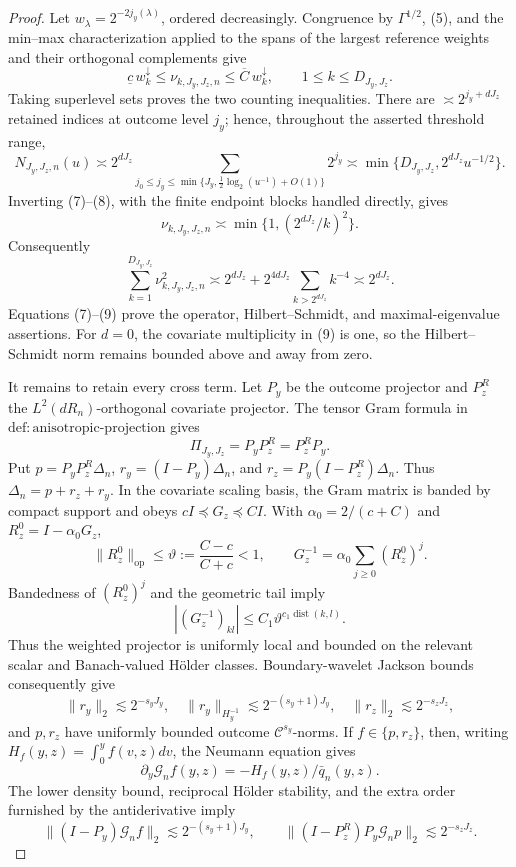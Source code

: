 \documentclass{article}
\begin{document}
\begin{proof}
Let \(w_\lambda=2^{-2j_y(\lambda)}\), ordered decreasingly.  Congruence by \(\Gamma^{1/2}\), (5), and the min--max characterization applied to the spans of the largest reference weights and their orthogonal complements give
\[
\underline c\,w_k^\downarrow\le\nu_{k,J_y,J_z,n}
\le\overline C\,w_k^\downarrow,
\qquad1\le k\le D_{J_y,J_z}. \tag{7}
\]
Taking superlevel sets proves the two counting inequalities.  There are \(\asymp2^{j_y+dJ_z}\) retained indices at outcome level \(j_y\); hence, throughout the asserted threshold range,
\[
N_{J_y,J_z,n}(u)
\asymp2^{dJ_z}\!\sum_{j_0\le j_y\le
\min\{J_y,\frac12\log_2(u^{-1})+O(1)\}}2^{j_y}
\asymp\min\{D_{J_y,J_z},2^{dJ_z}u^{-1/2}\}. \tag{8}
\]
Inverting (7)--(8), with the finite endpoint blocks handled directly, gives
\[
\nu_{k,J_y,J_z,n}\asymp\min\{1,(2^{dJ_z}/k)^2\}.
\]
Consequently
\[
\sum_{k=1}^{D_{J_y,J_z}}\nu_{k,J_y,J_z,n}^2
\asymp2^{dJ_z}+2^{4dJ_z}\sum_{k>2^{dJ_z}}k^{-4}
\asymp2^{dJ_z}. \tag{9}
\]
Equations (7)--(9) prove the operator, Hilbert--Schmidt, and maximal-eigenvalue assertions.  For \(d=0\), the covariate multiplicity in (9) is one, so the Hilbert--Schmidt norm remains bounded above and away from zero.

It remains to retain every cross term.  Let \(P_y\) be the outcome projector and \(P_z^R\) the \(L^2(dR_n)\)-orthogonal covariate projector.  The tensor Gram formula in \(\mathrm{def{:}anisotropic\text{-}projection}\) gives
\[
\Pi_{J_y,J_z}=P_yP_z^R=P_z^RP_y. \tag{10}
\]
Put \(p=P_yP_z^R\Delta_n\), \(r_y=(I-P_y)\Delta_n\), and \(r_z=P_y(I-P_z^R)\Delta_n\).  Thus \(\Delta_n=p+r_z+r_y\).  In the covariate scaling basis, the Gram matrix is banded by compact support and obeys \(cI\preceq G_z\preceq CI\).  With \(\alpha_0=2/(c+C)\) and \(R_z^0=I-\alpha_0G_z\),
\[
\|R_z^0\|_{\mathrm{op}}\le\vartheta:=\frac{C-c}{C+c}<1,
\qquad G_z^{-1}=\alpha_0\sum_{j\ge0}(R_z^0)^j.
\]
Bandedness of \((R_z^0)^j\) and the geometric tail imply
\[
|(G_z^{-1})_{kl}|\le C_1\vartheta^{c_1\operatorname{dist}(k,l)}. \tag{11}
\]
Thus the weighted projector is uniformly local and bounded on the relevant scalar and Banach-valued H\"older classes.  Boundary-wavelet Jackson bounds consequently give
\[
\|r_y\|_2\lesssim2^{-s_yJ_y},\quad
\|r_y\|_{H_y^{-1}}\lesssim2^{-(s_y+1)J_y},\quad
\|r_z\|_2\lesssim2^{-s_zJ_z}, \tag{12}
\]
and \(p,r_z\) have uniformly bounded outcome \(\mathcal C^{s_y}\)-norms.  If \(f\in\{p,r_z\}\), then, writing \(H_f(y,z)=\int_0^yf(v,z)dv\), the Neumann equation gives
\[
\partial_y\mathcal G_nf(y,z)=-H_f(y,z)/\bar q_n(y,z). \tag{13}
\]
The lower density bound, reciprocal H\"older stability, and the extra order furnished by the antiderivative imply
\[
\|(I-P_y)\mathcal G_nf\|_2\lesssim2^{-(s_y+1)J_y},
\qquad
\|(I-P_z^R)P_y\mathcal G_np\|_2\lesssim2^{-s_zJ_z}. \tag{14}
\]


\end{proof}
\end{document}

